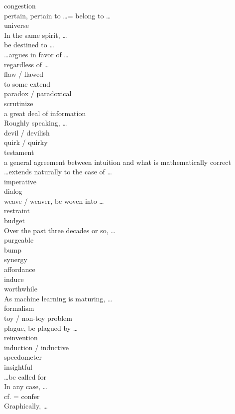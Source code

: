 \documentclass[12pt]{article}
\begin{document}
congestion \\
pertain, pertain to \dots = belong to \dots \\
universe \\
In the same spirit, \dots \\
be destined to \dots \\
\dots argues in favor of \dots \\
regardless of \dots \\
flaw / flawed \\
to some extend \\
paradox / paradoxical \\
scrutinize \\
a great deal of information \\
Roughly speaking, \dots \\
devil / devilish \\
quirk / quirky \\
testament \\
a general agreement between intuition and what is mathematically correct \\
\dots extends naturally to the case of \dots \\
imperative \\
dialog \\
weave / weaver, be woven into \dots \\
restraint \\
budget \\
Over the past three decades or so, \dots \\
purgeable \\
bump \\
synergy \\
affordance \\
induce \\
worthwhile \\
As machine learning is maturing, \dots \\
formalism \\
toy / non-toy problem \\
plague, be plagued by \dots \\
reinvention \\
induction / inductive \\
speedometer \\
insightful \\
\dots be called for \\
In any case, \dots \\
cf. = confer \\
Graphically, \dots \\
\end{document}
